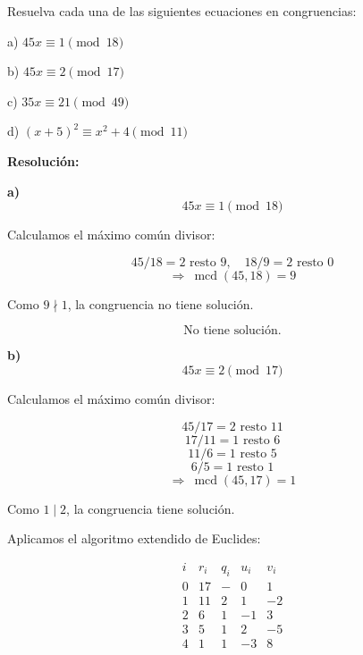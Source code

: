 \documentclass[a4paper,12pt]{article}
\begin{document}
\begin{ejercicio}[title=Ejercicio 32]
Resuelva cada una de las siguientes ecuaciones en congruencias:

a) $45x \equiv 1 \pmod{18}$

b) $45x \equiv 2 \pmod{17}$

c) $35x \equiv 21 \pmod{49}$

d) $(x+5)^2 \equiv x^2 + 4 \pmod{11}$

\tcblower
\textbf{Resolución:}

\textbf{a)} \\[0.3em]
\[
45x \equiv 1 \pmod{18}
\]

Calculamos el máximo común divisor:

\[
45 / 18 = 2 \text{ resto } 9,\quad 18 / 9 = 2 \text{ resto } 0
\]
\[
\Rightarrow \ \operatorname{mcd}(45,18) = 9
\]

Como $9\nmid 1$, la congruencia no tiene solución.

\[
\boxed{\text{No tiene solución.}}
\]

\vspace{1em}

\textbf{b)} \\[0.3em]
\[
45x \equiv 2 \pmod{17}
\]

Calculamos el máximo común divisor:

\[
45 / 17 = 2 \text{ resto } 11
\]
\[
17 / 11 = 1 \text{ resto } 6
\]
\[
11 / 6 = 1 \text{ resto } 5
\]
\[
6 / 5 = 1 \text{ resto } \boxed{1}
\]
\[
\Rightarrow \ \operatorname{mcd}(45,17) = \boxed{1}
\]

Como $1\mid 2$, la congruencia tiene solución.

\vspace{0.5em}

Aplicamos el algoritmo extendido de Euclides:

\[
\begin{array}{c|c|c|c|c}
i & r_i & q_i & u_i & v_i \\ \hline
0 & 17 & - & 0 & 1 \\
1 & 11 & 2 & 1 & -2 \\
2 & 6 & 1 & -1 & 3 \\
3 & 5 & 1 & 2 & -5 \\
4 & \boxed{1} & 1 & -3 & 8 \\
\end{array}
\]

\end{ejercicio}
\end{document}

